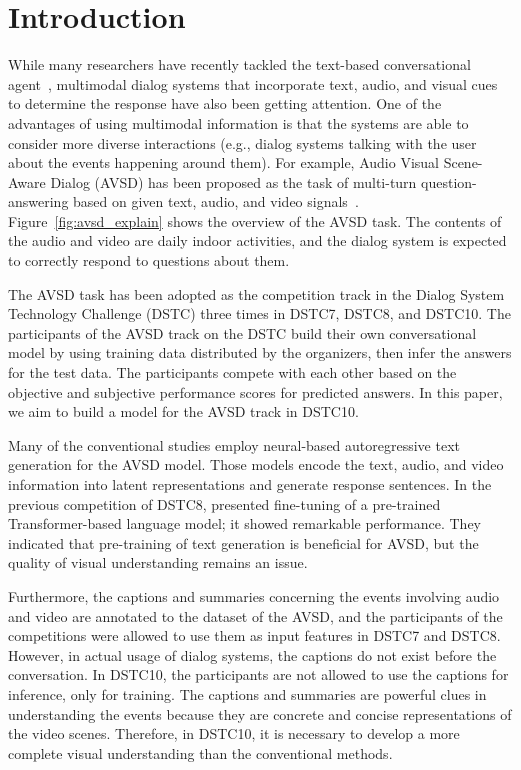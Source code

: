 \documentclass[letterpaper]{article}
\begin{document}
\section{Introduction}
While many researchers have recently tackled the text-based conversational agent~\cite{Heck2020trippy,Xu2021beyond}, multimodal dialog systems that incorporate text, audio, and visual cues to determine the response have also been getting attention.
One of the advantages of using multimodal information is that the systems are able to consider more diverse interactions (e.g., dialog systems talking with the user about the events happening around them).
For example, Audio Visual Scene-Aware Dialog (AVSD) has been proposed as the task of multi-turn question-answering based on given text, audio, and video signals~\cite{Nguyen2018from,Hori2019joint,Li2021bridging}.
Figure~\ref{fig:avsd_explain} shows the overview of the AVSD task.
The contents of the audio and video are daily indoor activities, and the dialog system is expected to correctly respond to questions about them.

The AVSD task has been adopted as the competition track in the Dialog System Technology Challenge (DSTC) three times in DSTC7, DSTC8, and DSTC10.
The participants of the AVSD track on the DSTC build their own conversational model by using training data distributed by the organizers, then infer the answers for the test data.
The participants compete with each other based on the objective and subjective performance scores for predicted answers.
In this paper, we aim to build a model for the AVSD track in DSTC10.

Many of the conventional studies employ neural-based autoregressive text generation for the AVSD model.
Those models encode the text, audio, and video information into latent representations and generate response sentences.
In the previous competition of DSTC8, \citet{Li2021bridging} presented fine-tuning of a pre-trained Transformer-based language model; it showed remarkable performance.
They indicated that pre-training of text generation is beneficial for AVSD, but the quality of visual understanding remains an issue.

Furthermore, the captions and summaries concerning the events involving audio and video are annotated to the dataset of the AVSD, and the participants of the competitions were allowed to use them as input features in DSTC7 and DSTC8.
However, in actual usage of dialog systems, the captions do not exist before the conversation.
In DSTC10, the participants are not allowed to use the captions for inference, only for training.
The captions and summaries are powerful clues in understanding the events because they are concrete and concise representations of the video scenes.
Therefore, in DSTC10, it is necessary to develop a more complete visual understanding than the conventional methods.
\end{document}
